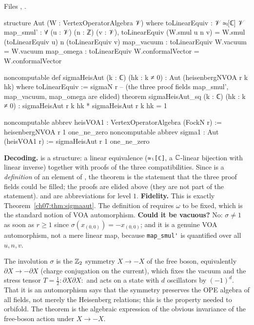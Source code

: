 \noindent Files , .
\begin{leancode}
structure Aut (W : VertexOperatorAlgebra 𝒱) where
  toLinearEquiv : 𝒱 ≃ₗ[ℂ] 𝒱
  map_smul' : ∀ (u : 𝒱) (n : ℤ) (v : 𝒱),
    toLinearEquiv (W.smul u n v) = W.smul (toLinearEquiv u) n (toLinearEquiv v)
  map_vacuum : toLinearEquiv W.vacuum = W.vacuum
  map_omega : toLinearEquiv W.conformalVector = W.conformalVector

noncomputable def sigmaHeisAut (k : ℂ) (hk : k ≠ 0) : Aut (heisenbergNVOA r k hk) where
  toLinearEquiv := sigmaN r
  -- (the three proof fields map_smul', map_vacuum, map_omega are elided)
theorem sigmaHeisAut_sq (k : ℂ) (hk : k ≠ 0) : sigmaHeisAut r k hk * sigmaHeisAut r k hk = 1

noncomputable abbrev heisVOA1 : VertexOperatorAlgebra (FockN r) :=
  heisenbergNVOA r 1 one_ne_zero
noncomputable abbrev sigma1 : Aut (heisVOA1 r) := sigmaHeisAut r 1 one_ne_zero
\end{leancode}

\begin{dictionary}
\textbf{Decoding.}  is a structure: a linear equivalence (\verb|≃ₗ[ℂ]|, a
${\mathbb{C}}$-linear bijection with linear inverse) together with proofs of the three compatibilities.
Since  is a \emph{definition} of an element of , the theorem is the
statement that the three proof fields could be filled; the proofs are elided above (they are
not part of the statement).  and  are abbreviations for level
$1$. \textbf{Fidelity.} This is exactly Theorem~\ref{ch07:thm:sigmaaut}. The definition of
 requires $\omega$ to be fixed, which is the standard notion of VOA automorphism.
\textbf{Could it be vacuous?} No: $\sigma\ne1$ as soon as $r\ge1$ since $\sigma(x_{(0,0)}) =
-x_{(0,0)}$; and it is a genuine VOA automorphism, not a mere linear map, because
\verb|map_smul'| is quantified over all $u,n,v$.
\end{dictionary}

\begin{physics}
The involution $\sigma$ is the ${\mathbb{Z}}_2$ symmetry $X\to-X$ of the free boson, equivalently $\partial X\to-\partial X$ (charge conjugation on the current), which fixes the vacuum and the stress tensor $T=\tfrac12{:}\partial X\partial X{:}$ and acts on a state with $d$ oscillators by $(-1)^d$. That it is an automorphism says that the symmetry preserves the OPE algebra of all fields, not merely the Heisenberg relations; this is the property needed to orbifold. The theorem is the algebraic expression of the obvious invariance of the free-boson action under $X\to-X$.
\end{physics}


